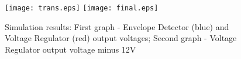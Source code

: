 \begin{figure}[H]
        \centering
        \texttt{[image: trans.eps]}
        \vspace{1cm}
        \texttt{[image: final.eps]}        
        \caption{Simulation results: First graph - Envelope Detector (blue) and Voltage Regulator (red) output voltages; Second graph - Voltage Regulator output voltage minus 12V}
        \label{sim_res}
\end{figure}


